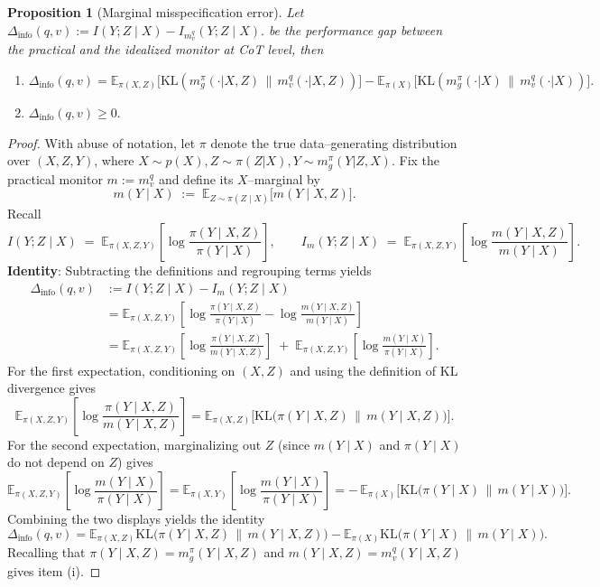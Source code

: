 \documentclass{article}
\theoremstyle{plain}
\newtheorem{proposition}[theorem]{Proposition}
\begin{document}
\begin{proposition}[Marginal misspecification error] Let
\(
\Delta_{\mathrm{info}}(q,v) := I(Y;Z\mid X) - I_{m_v^{q}}(Y;Z\mid X).
\) be the performance gap between the practical and the idealized monitor at CoT level, then 
\begin{enumerate}[leftmargin=*]
\item 
\(
\Delta_{\mathrm{info}}(q,v) = \mathbb{E}_{\pi(X,Z)} \big[ \mathrm{KL}(m_g^{\pi}(\cdot|X,Z)\,\|\,m_v^{q}(\cdot|X,Z)) \big] 
- \mathbb{E}_{\pi(X)}\big[ \mathrm{KL}(m_g^{\pi}(\cdot|X)\,\|\,m_v^{q}(\cdot|X)) \big].
\)
\item \(\Delta_{\mathrm{info}}(q,v) \ge 0.\)
\end{enumerate}
\end{proposition}
\begin{proof}
With abuse of notation, let $\pi$ denote the true data–generating distribution over $(X,Z,Y)$, where $X\sim p(X), Z\sim \pi(Z|X), Y\sim m_g^\pi(Y|Z,X)$.
Fix the practical monitor $m:=m_v^{q}$ and define its $X$–marginal by
\[
m(Y\mid X)\;:=\;\mathbb{E}_{Z\sim \pi(Z\mid X)}\big[m(Y\mid X,Z)\big].
\]
Recall
\[
I(Y;Z\mid X)\;=\;\mathbb{E}_{\pi(X,Z,Y)}\!\left[\log\frac{\pi(Y\mid X,Z)}{\pi(Y\mid X)}\right],
\qquad
I_{m}(Y;Z\mid X)\;=\;\mathbb{E}_{\pi(X,Z,Y)}\!\left[\log\frac{m(Y\mid X,Z)}{m(Y\mid X)}\right].
\]
\textbf{Identity}:
Subtracting the definitions and regrouping terms yields
\begin{align*}
\Delta_{\mathrm{info}}(q,v)
&:= I(Y;Z\mid X)-I_m(Y;Z\mid X) \\
&=\mathbb{E}_{\pi(X,Z,Y)}\!\left[
\log\frac{\pi(Y\mid X,Z)}{\pi(Y\mid X)}-\log\frac{m(Y\mid X,Z)}{m(Y\mid X)}
\right] \\
&=\mathbb{E}_{\pi(X,Z,Y)}\!\left[
\log\frac{\pi(Y\mid X,Z)}{m(Y\mid X,Z)}
\right]
\;+\;
\mathbb{E}_{\pi(X,Z,Y)}\!\left[
\log\frac{m(Y\mid X)}{\pi(Y\mid X)}
\right].
\end{align*}
For the first expectation, conditioning on $(X,Z)$ and using the definition of KL divergence gives
\[
\mathbb{E}_{\pi(X,Z,Y)}\!\left[
\log\frac{\pi(Y\mid X,Z)}{m(Y\mid X,Z)}
\right]
=\mathbb{E}_{\pi(X,Z)}\!\Big[\mathrm{KL}\big(\pi(Y\mid X,Z)\,\|\,m(Y\mid X,Z)\big)\Big].
\]
For the second expectation, marginalizing out $Z$ (since $m(Y\mid X)$ and $\pi(Y\mid X)$ do not depend on $Z$) gives
\[
\mathbb{E}_{\pi(X,Z,Y)}\!\left[
\log\frac{m(Y\mid X)}{\pi(Y\mid X)}
\right]
=\mathbb{E}_{\pi(X,Y)}\!\left[
\log\frac{m(Y\mid X)}{\pi(Y\mid X)}
\right]
=-\,\mathbb{E}_{\pi(X)}\!\Big[\mathrm{KL}\big(\pi(Y\mid X)\,\|\,m(Y\mid X)\big)\Big].
\]
Combining the two displays yields the identity
\[
\Delta_{\mathrm{info}}(q,v)
=
\mathbb{E}_{\pi(X,Z)} \mathrm{KL}\!\big(\pi(Y\mid X,Z)\,\big\|\,m(Y\mid X,Z)\big)
-
\mathbb{E}_{\pi(X)} \mathrm{KL}\!\big(\pi(Y\mid X)\,\big\|\,m(Y\mid X)\big).
\]
Recalling that $\pi(Y\mid X,Z)=m_g^{\pi}(Y\mid X,Z)$ and $m(Y\mid X,Z)=m_v^{q}(Y\mid X,Z)$ gives item (i).


\end{proof}
\end{document}
